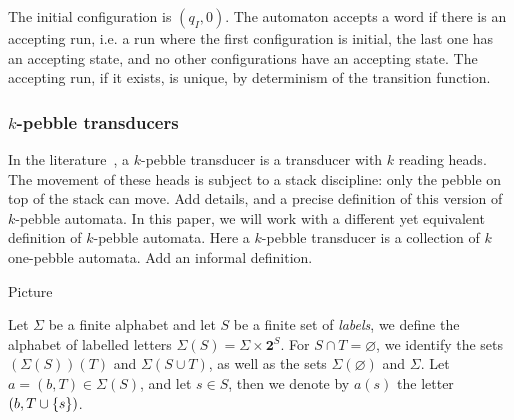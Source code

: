 
The initial configuration is $(q_I, 0)$. The automaton accepts a word if there is an accepting run,
i.e. a run where the first configuration is initial, the last one has an accepting
state, and no other configurations have an accepting state. The accepting run, if it exists, is unique, by determinism of the transition function.


\subsubsection{$k$-pebble transducers}

In the literature~\cite{}, a $k$-pebble transducer is a transducer with $k$ reading heads. The movement of these heads is subject to a stack discipline: only the pebble on top of the stack can move. Add details, and a precise definition of this version of $k$-pebble automata. 
In this paper, we will work with a different yet equivalent definition of $k$-pebble automata. Here a $k$-pebble transducer is a collection of $k$ one-pebble automata. Add an informal definition.
\begin{center}
Picture
\end{center}
Let $\Sigma$ be a finite alphabet and let $S$ be a finite set of \emph{labels}, we define the alphabet of labelled letters $\Sigma(S)=\Sigma\times \mathbf 2^S$. For $S\cap T=\varnothing$, we identify the sets $(\Sigma(S))(T)$ and $\Sigma(S\cup T)$, as well as the sets $\Sigma(\varnothing)$ and $\Sigma$.
Let $a=(b,T)\in \Sigma(S)$, and let $s\in S$, then we denote by  $a(s)$ the letter $(b,T\cup\{s\})$.

\begin{comment}
\begin{definition}%
A $k$-pebble transducer of input alphabet $\Sigma$ and output alphabet $\Gamma$ is a tuple $\Tt=(T_k,\dots,T_{1})$ such that for every $i\leq n$:
\begin{itemize}
\item  $T_i$ is 1-pebble transducer, whose set of states is $Q_i$;
\item  The input alphabet of $T_i$ is $\Sigma_{[i+1,k]}$;
\item  The output alphabet of $T_i$ is $\Gamma\cup\bigcup_{1\leq j <i } Q_j$.
\end{itemize} 
In particular, the input alphabet of $T_k$ is $\Sigma$ and the output alphabet of $T_1$ is $\Gamma$. We denote by $\Tt_i$ the transducer $T_i$. 
\end{definition}
\end{comment}

